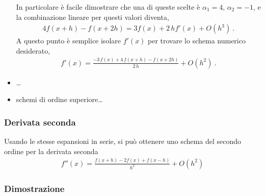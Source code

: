\documentclass[letterpaper,10pt,english]{jupyterBook}
\begin{document}
\begin{itemize}
\sphinxAtStartPar
In particolare è facile dimostrare che una di queste scelte è \(\alpha_1 = 4\), \(\alpha_2 = -1\), e la combinazione lineare per questi valori diventa,
\begin{equation*}
\begin{split}4 f(x+h) - f(x+2h) = 3 f(x) + 2 \, h f'(x) + O(h^3) \ .\end{split}
\end{equation*}
\sphinxAtStartPar
A questo punto è semplice isolare \(f'(x)\) per trovare lo schema numerico desiderato,
\begin{equation*}
\begin{split}f'(x) = \frac{-3 \, f(x) + 4 \, f(x+h) - f(x+2h)}{2 \, h} + O(h^2) \ .\end{split}
\end{equation*}
\item {} 
\sphinxAtStartPar
…

\item {} 
\sphinxAtStartPar
schemi di ordine superiore…

\end{itemize}


\subsubsection{Derivata seconda}
\label{\detokenize{ch/numerics/derivatives:derivata-seconda}}
\sphinxAtStartPar
Usando le stesse espansioni in serie, si può ottenere uno schema del secondo ordine per la derivata seconda
\begin{equation*}
\begin{split}f''(x) = \frac{f(x+h) - 2 f(x) + f(x-h)}{h^2} + O(h^2)\end{split}
\end{equation*}\subsubsection*{Dimostrazione}
\end{document}
